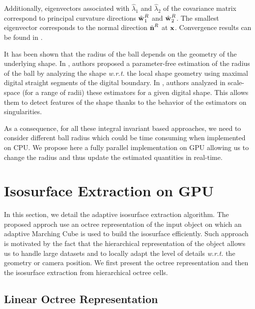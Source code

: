 \documentclass{llncs}
\newcommand{\wrt}{\emph{w.r.t.} }
\begin{document}
Additionally, eigenvectors associated with $\hat{\lambda}_1$ and
$\hat{\lambda}_2$ of the covariance matrix correspond to principal curvature
directions $\hat{\mathbf{w}_{}}_{1}^{R}$ and $\hat{\mathbf{w}_{}}_{2}^{R}$. The smallest eigenvector
corresponds to the normal direction $\hat{\mathbf{n}{}}^{R}$ at $\mathbf{x}$. Convergence
results can be found in \cite{CVIU2014}.%

It has been shown that the radius of the ball depends on the geometry of the
underlying shape. In \cite{DGCI2014}, authors proposed a parameter-free
estimation of the radius of the ball by analyzing the shape \wrt the local shape
geometry using maximal digital straight segments of the digital boundary. In
\cite{SMI2015}, authors analyzed in scale-space (for a range of radii) these
estimators for a given digital shape. This allows them to detect features of the
shape thanks to the behavior of the estimators on singularities.

As a consequence, for all these integral invariant based approaches, we need to
consider different ball radius which could be time consuming when implemented on
CPU. We propose here a fully parallel implementation on GPU allowing us to
change the radius and thus update the estimated quantities in real-time.

\section{Isosurface Extraction on GPU}
\label{sec:isos-extr-gpu}

In this section, we detail the adaptive isosurface extraction
algorithm.
The proposed approch use an octree representation of the input object
on which an adaptive Marching Cube is used to build the isosurface efficiently.
Such approach is motivated by
the fact that the hierarchical representation of the object allows us
to handle large datasets and to locally adapt the level of details
\wrt the geometry or camera position. We first present the
octree representation and then the isosurface extraction from
hierarchical octree cells.

\subsection{Linear Octree Representation}
\end{document}

